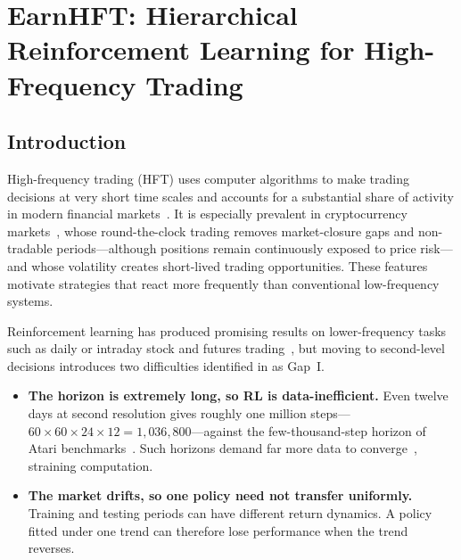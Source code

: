 
\chapter[EarnHFT: Hierarchical RL for HFT]{EarnHFT: Hierarchical Reinforcement Learning for High-Frequency Trading} %
\label{ch:earnhft}

\section{Introduction}
\label{sec:earnhft_intro}

High-frequency trading (HFT) uses computer algorithms to make trading decisions at very short time scales and accounts for a substantial share of activity in modern financial markets~\cite{hhu032}. It is especially prevalent in cryptocurrency markets~\cite{ALMEIDA2023100785}, whose round-the-clock trading removes market-closure gaps and non-tradable periods---although positions remain continuously exposed to price risk---and whose volatility creates short-lived trading opportunities. These features motivate strategies that react more frequently than conventional low-frequency systems.

Reinforcement learning has produced promising results on lower-frequency tasks such as daily or intraday stock and futures trading~\cite{sun2022deepscalper,briola2021deep}, but moving to second-level decisions introduces two difficulties identified in  as Gap~I.

\begin{itemize}
\item \textbf{The horizon is extremely long, so RL is data-inefficient.} Even twelve days at second resolution gives roughly one million steps---$60\times 60\times 24\times 12 = 1{,}036{,}800$---against the few-thousand-step horizon of Atari benchmarks~\cite{mnih2013playing}. Such horizons demand far more data to converge~\cite{zhang2023towards}, straining computation.
\item \textbf{The market drifts, so one policy need not transfer uniformly.} Training and testing periods can have different return dynamics. A policy fitted under one trend can therefore lose performance when the trend reverses.
\end{itemize}

